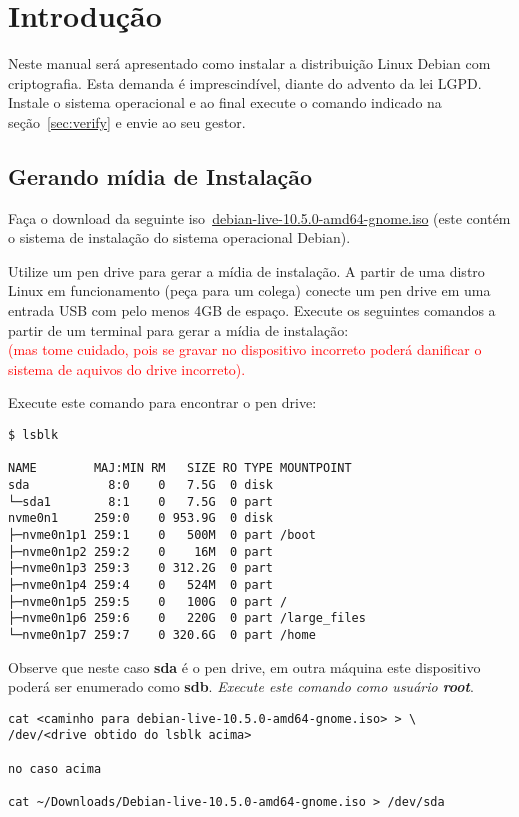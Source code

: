 \section{Introdução} \label{sec:intro}
Neste manual será apresentado como instalar a distribuição Linux
Debian com criptografia. Esta demanda é imprescindível, diante do
advento da lei LGPD. Instale o sistema operacional e ao final execute
o comando indicado na seção~\ref{sec:verify} e envie ao seu gestor.

\subsection{Gerando mídia de Instalação} \label{subsec:gen}
Faça o download da seguinte
iso~\href{http://ftp.br.debian.org/debian-cd/10.5.0-live/amd64/iso-hybrid/debian-live-10.5.0-amd64-gnome.iso}{debian-live-10.5.0-amd64-gnome.iso}
(este contém o sistema de instalação do sistema operacional Debian).

Utilize um pen drive para gerar a mídia de instalação. A partir de uma
distro Linux em funcionamento (peça para um colega) conecte um pen
drive em uma entrada USB com pelo menos 4GB de espaço. Execute os
seguintes comandos a partir de um terminal para gerar a mídia de instalação:\\

\textcolor{red}{(mas tome cuidado,
pois se gravar no dispositivo incorreto poderá danificar o sistema de
aquivos do drive incorreto).}

Execute este comando para encontrar o pen drive:
\begin{verbatim}
$ lsblk

NAME        MAJ:MIN RM   SIZE RO TYPE MOUNTPOINT
sda           8:0    0   7.5G  0 disk
└─sda1        8:1    0   7.5G  0 part 
nvme0n1     259:0    0 953.9G  0 disk 
├─nvme0n1p1 259:1    0   500M  0 part /boot
├─nvme0n1p2 259:2    0    16M  0 part 
├─nvme0n1p3 259:3    0 312.2G  0 part 
├─nvme0n1p4 259:4    0   524M  0 part 
├─nvme0n1p5 259:5    0   100G  0 part /
├─nvme0n1p6 259:6    0   220G  0 part /large_files
└─nvme0n1p7 259:7    0 320.6G  0 part /home
\end{verbatim}

Observe que neste caso \textbf{sda} é o pen drive, em outra máquina este
dispositivo poderá ser enumerado como \textbf{sdb}. \emph{Execute este
comando como usuário \textbf{root}}.

\begin{verbatim}
cat <caminho para debian-live-10.5.0-amd64-gnome.iso> > \
/dev/<drive obtido do lsblk acima>

no caso acima

cat ~/Downloads/Debian-live-10.5.0-amd64-gnome.iso > /dev/sda
\end{verbatim}

